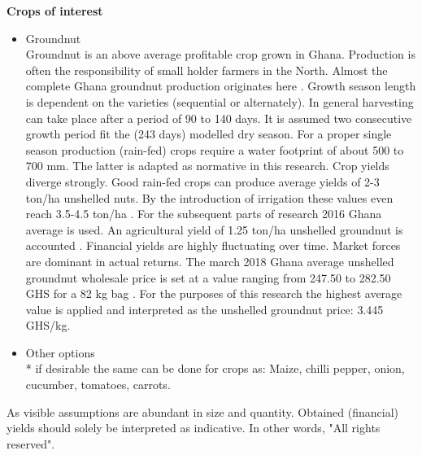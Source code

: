 \textbf{Crops of interest}
\begin{itemize}
\item{Groundnut} \\
Groundnut is an above average profitable crop grown in Ghana. Production is often the responsibility of small holder farmers in the North. Almost the complete Ghana groundnut production originates here \citep{Ghana-made2018}. Growth season length is dependent on the varieties (sequential or alternately). In general harvesting can take place after a period of 90 to 140 days. It is assumed two consecutive growth period fit the (243 days) modelled dry season. For a proper single season production (rain-fed) crops require a water footprint of about 500 to 700 mm. The latter is adapted as normative in this research. Crop yields diverge strongly. Good rain-fed crops can produce average yields of 2-3 ton/ha unshelled nuts. By the introduction of irrigation these values even reach 3.5-4.5 ton/ha \citep{FoodandAgriculturalOrganisationoftheUnitedNationsFAO2018a}. For the subsequent parts of research 2016 Ghana average is used. An agricultural yield of 1.25 ton/ha unshelled groundnut is accounted \citep{FoodandAgriculturalOrganisationoftheUnitedNationsFAO2018}. Financial yields are highly fluctuating over time. Market forces are dominant in actual returns. The march 2018 Ghana average unshelled groundnut wholesale price is set at a value ranging from 247.50 to 282.50 GHS for a 82 kg bag \citep{ModernGhana2018}. For the purposes of this research the highest average value is applied and interpreted as the unshelled groundnut price: 3.445 GHS/kg. 

\item{Other options} \\
* if desirable the same can be done for crops as: Maize, chilli pepper, onion, cucumber, tomatoes, carrots. 
\end{itemize}

As visible assumptions are abundant in size and quantity. Obtained (financial) yields should solely be interpreted as indicative. In other words, "All rights reserved". \\
 
